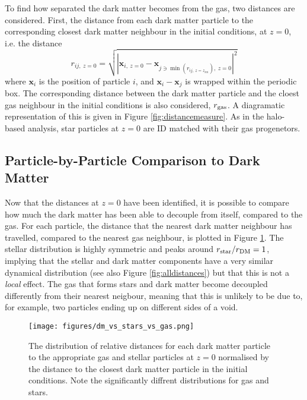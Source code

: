 To find how separated the dark matter becomes from the gas, two distances are considered. First, the distance from each dark matter particle to the corresponding closest dark matter neighbour in the initial conditions, at $z=0$, i.e. the distance
\begin{equation}
    r_{ij, ~z=0} = \sqrt{
        \left|
            \mathbf{x}_{i, ~z=0} - \mathbf{x}_{j \ni \min(r_{ij, ~z=z_{ini}}), ~z=0}
        \right|^2
    }
    \label{eqn:minimal}
\end{equation}
where $\mathbf{x}_i$ is the position of particle $i$, and $\mathbf{x}_i - \mathbf{x}_j$ is wrapped within the periodic box. The corresponding distance between the dark matter particle and the cloest gas neighbour in the initial conditions is also considered, $r_{\rm gas}$. A diagramatic representation of this is given in Figure \ref{fig:distancemeasure}. As in the halo-based analysis, star particles at $z=0$ are ID matched with their gas progenetors.

\subsection{Particle-by-Particle Comparison to Dark Matter}

Now that the distances at $z=0$ have been identified, it is possible to compare how much the dark matter has been able to decouple from itself, compared to the gas. For each particle, the distance that the nearest dark matter neighbour has travelled, compared to the nearest gas neighbour, is plotted in Figure \ref{fig:dmvsstarvsgas}. The stellar distribution is highly symmetric and peaks around $r_{\rm star}/r_{\rm DM} = 1$, implying that the stellar and dark matter components have a very similar dynamical distribution (see also Figure \ref{fig:alldistances}) but that this is not a \emph{local} effect. The gas that forms stars and dark matter become decoupled differently from their nearest neigbour, meaning that this is unlikely to be due to, for example, two particles ending up on different sides of a void.

\begin{figure}
    \centering
    \texttt{[image: figures/dm\_vs\_stars\_vs\_gas.png]}
    \caption{The distribution of relative distances for each dark matter particle to the appropriate gas and stellar particles at $z=0$ normalised by the distance to the closest dark matter particle in the initial conditions. Note the significantly diffrent distributions for gas and stars.}
    \label{fig:dmvsstarvsgas}
\end{figure}

